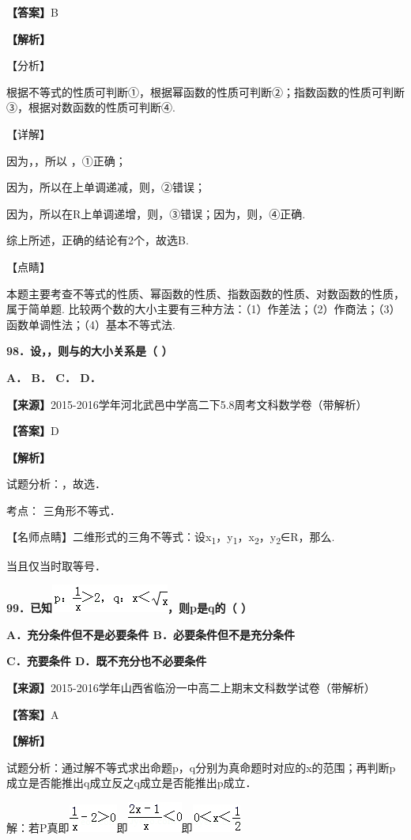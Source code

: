 \documentclass[
]{article}
\begin{document}
\textbf{【答案】}B

\textbf{【解析】}

【分析】

根据不等式的性质可判断①，根据幂函数的性质可判断②；指数函数的性质可判断③，根据对数函数的性质可判断④.

【详解】

因为，，所以 ，①正确；

因为，所以在上单调递减，则，②错误；

因为，所以在R上单调递增，则，③错误；因为，则，④正确.

综上所述，正确的结论有2个，故选B.

【点睛】

本题主要考查不等式的性质、幂函数的性质、指数函数的性质、对数函数的性质，属于简单题.
比较两个数的大小主要有三种方法：（1）作差法；（2）作商法；（3）函数单调性法；（4）基本不等式法.

\textbf{98．设，，则与的大小关系是（ ）}

\textbf{A． B． C． D．}

\textbf{【来源】}2015-2016学年河北武邑中学高二下5.8周考文科数学卷（带解析）

\textbf{【答案】}D

\textbf{【解析】}

试题分析：，故选．

考点： 三角形不等式．

【名师点睛】二维形式的三角不等式：设x\textsubscript{1}，y\textsubscript{1}，x\textsubscript{2}，y\textsubscript{2}∈R，那么.

当且仅当时取等号．

\textbf{99．已知}\includegraphics{Fig//media/image1028.png}\textbf{，则p是q的（
）}

\textbf{A．充分条件但不是必要条件 B．必要条件但不是充分条件}

\textbf{C．充要条件 D．既不充分也不必要条件}

\textbf{【来源】}2015-2016学年山西省临汾一中高二上期末文科数学试卷（带解析）

\textbf{【答案】}A

\textbf{【解析】}

试题分析：通过解不等式求出命题p，q分别为真命题时对应的x的范围；再判断p成立是否能推出q成立反之q成立是否能推出p成立．

解：若P真即\includegraphics{Fig//media/image1029.png}即\includegraphics{Fig//media/image1030.png}即\includegraphics{Fig//media/image1031.png}
\end{document}
